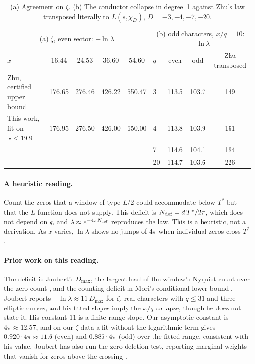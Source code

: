 \documentclass[11pt]{article}
\theoremstyle{remark}
\begin{document}
\begin{table}[h]
\centering\small
\begin{tabular}{@{}lcccc@{\qquad}lccc@{}}
\toprule
\multicolumn{5}{c}{(a) $\zeta$, even sector: $-\ln\lambda$} & \multicolumn{4}{c}{(b) odd characters, $x/q=10$: $-\ln\lambda$}\\
$x$ & 16.44 & 24.53 & 36.60 & 54.60 & $q$ & even & odd & Zhu transposed\\
\midrule
Zhu, certified upper bound & 176.65 & 276.46 & 426.22 & 650.47 & 3 & 113.5 & 103.7 & 149\\
This work, fit on $x\le19.9$ & 176.95 & 276.50 & 426.00 & 650.00 & 4 & 113.8 & 103.9 & 161\\
 & & & & & 7 & 114.6 & 104.1 & 184\\
 & & & & & 20 & 114.7 & 103.6 & 226\\
\bottomrule
\end{tabular}
\caption{(a) Agreement on $\zeta$. (b) The conductor collapse in degree~1 against Zhu's law transposed literally to $L(s,\chi_D)$, $D=-3,-4,-7,-20$.}\label{tab:zhu}
\end{table}

\paragraph{A heuristic reading.} Count the zeros that a window of type $L/2$ could accommodate below $T^*$ but that the $L$-function does not supply. This deficit is $N_{\rm def}=d\,T^*/2\pi$, which does not depend on $q$, and $\lambda\approx e^{-4\pi N_{\rm def}}$ reproduces the law. This is a heuristic, not a derivation. As $x$ varies, $\ln\lambda$ shows no jumps of $4\pi$ when individual zeros cross $T^*$.

\paragraph{Prior work on this reading.} The deficit is Joubert's $D_{\max}$, the largest lead of the window's Nyquist count over the zero count \cite{joubert26}, and the counting deficit in Mori's conditional lower bound \cite{mori26d}. Joubert reports $-\ln\lambda\approx 11\,D_{\max}$ for $\zeta$, real characters with $q\le31$ and three elliptic curves, and his fitted slopes imply the $x/q$ collapse, though he does not state it. His constant $11$ is a finite-range slope. Our asymptotic constant is $4\pi\approx12.57$, and on our $\zeta$ data a fit without the logarithmic term gives $0.920\cdot4\pi\approx11.6$ (even) and $0.885\cdot4\pi$ (odd) over the fitted range, consistent with his value. Joubert has also run the zero-deletion test, reporting marginal weights that vanish for zeros above the crossing \cite{joubert26}.
\end{document}
